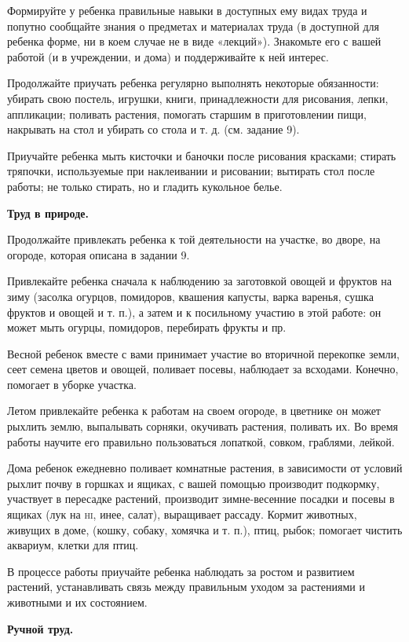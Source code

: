 \documentclass[a5paper]{book}
\begin{document}
Формируйте у ребенка правильные навыки в доступных ему видах труда и
попутно сообщайте знания о предметах и материалах труда (в доступной для
ребенка форме, ни в коем случае не в виде «лекций»). Знакомьте его с
вашей работой (и в учреждении, и дома) и поддерживайте к ней интерес.

Продолжайте приучать ребенка регулярно выполнять некоторые обязанности:
убирать свою постель, игрушки, книги, принадлежности для рисования,
лепки, аппликации; поливать растения, помогать старшим в приготовлении
пищи, накрывать на стол и убирать со стола и т. д. (см. задание 9).

Приучайте ребенка мыть кисточки и баночки после рисования красками;
стирать тряпочки, используемые при наклеивании и рисовании; вытирать
стол после работы; не только стирать, но и гладить кукольное белье.

\textbf{Труд в природе.}

Продолжайте привлекать ребенка к той деятельности на участке, во дворе,
на огороде, которая описана в задании 9.

Привлекайте ребенка сначала к наблюдению за заготовкой овощей и фруктов
на зиму (засолка огурцов, помидоров, квашения капусты, варка варенья,
сушка фруктов и овощей и т. п.), а затем и к посильному участию в этой
работе: он может мыть огурцы, помидоров, перебирать фрукты и пр.

Весной ребенок вместе с вами принимает участие во вторичной перекопке
земли, сеет семена цветов и овощей, поливает посевы, наблюдает за
всходами. Конечно, помогает в уборке участка.

Летом привлекайте ребенка к работам на своем огороде, в цветнике он
может рыхлить землю, выпалывать сорняки, окучивать растения, поливать
их. Во время работы научите его правильно пользоваться лопаткой, совком,
граблями, лейкой.

Дома ребенок ежедневно поливает комнатные растения, в зависимости от
условий рыхлит почву в горшках и ящиках, с вашей помощью производит
подкормку, участвует в пересадке растений, производит зимне-весенние
посадки и посевы в ящиках (лук на \textsc{hi,} инее, салат), выращивает
рассаду. Кормит животных, живущих в доме, (кошку, собаку, хомячка и т.
п.), птиц, рыбок; помогает чистить аквариум, клетки для птиц.

В процессе работы приучайте ребенка наблюдать за ростом и развитием
растений, устанавливать связь между правильным уходом за растениями и
животными и их состоянием.

\textbf{Ручной труд.}
\end{document}
